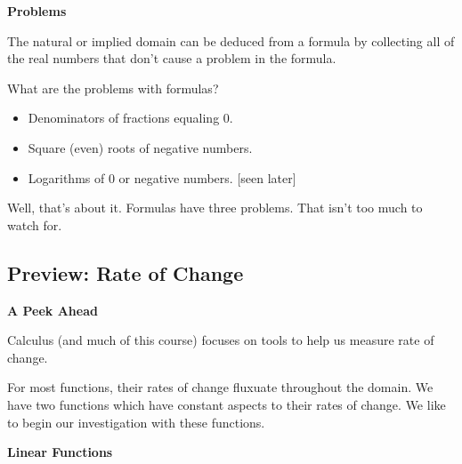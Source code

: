 \documentclass{ximera}
\begin{document}
\begin{warning} \textbf{\textcolor{red!70!darkgray}{Problems}}   

The natural or implied domain can be deduced from a formula by collecting all of the real numbers that don't cause a problem in the formula. 

What are the problems with formulas?

\begin{itemize}
\item  Denominators of fractions equaling $0$. \\
\item  Square (even) roots of negative numbers.    \\
\item  Logarithms of $0$ or negative numbers.  [seen later] 
\end{itemize}

Well, that's about it.  Formulas have three problems.  That isn't too much to watch for.


\end{warning}

































\subsection*{Preview: Rate of Change}
\textbf{\textcolor{red!70!black}{A Peek Ahead}}


Calculus (and much of this course) focuses on tools to help us measure rate of change. 


For most functions, their rates of change fluxuate throughout the domain.  We have two functions which have constant aspects to their rates of change.  We like to begin our investigation with these functions.






\textbf{\textcolor{purple!85!blue}{Linear Functions}}
\end{document}
